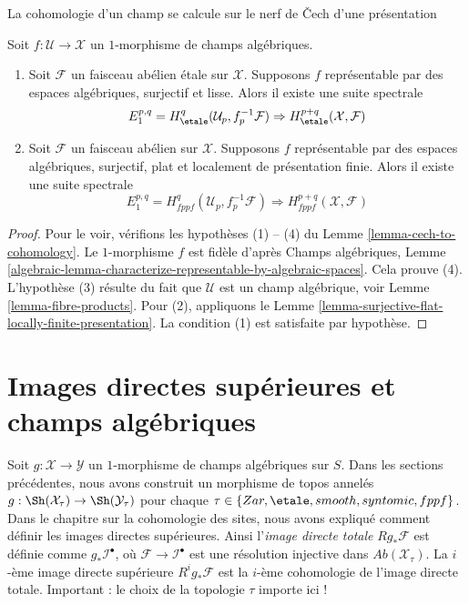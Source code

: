 \begin{proposition}
\label{proposition-smooth-covering-compute-cohomology}
\begin{slogan}
La cohomologie d'un champ se calcule sur le nerf de Čech d'une présentation
\end{slogan}
Soit $f : \mathcal{U} \to \mathcal{X}$ un $1$-morphisme de champs algébriques.
\begin{enumerate}
\item Soit $\mathcal{F}$ un faisceau abélien \'etale sur $\mathcal{X}$.
Supposons $f$ représentable par des espaces algébriques, surjectif et lisse.
Alors il existe une suite spectrale
$$
E_1^{p, q} = H^q_\etale(\mathcal{U}_p, f_p^{-1}\mathcal{F})
\Rightarrow
H^{p + q}_\etale(\mathcal{X}, \mathcal{F})
$$
\item Soit $\mathcal{F}$ un faisceau abélien sur $\mathcal{X}$.
Supposons $f$ représentable par des espaces algébriques, surjectif, plat
et localement de présentation finie. Alors il existe
une suite spectrale
$$
E_1^{p, q} = H^q_{fppf}(\mathcal{U}_p, f_p^{-1}\mathcal{F})
\Rightarrow
H^{p + q}_{fppf}(\mathcal{X}, \mathcal{F})
$$
\end{enumerate}
\end{proposition}

\begin{proof}
Pour le voir, vérifions les hypothèses (1) -- (4) du
Lemme \ref{lemma-cech-to-cohomology}.
Le $1$-morphisme $f$ est fidèle d'après
Champs algébriques, Lemme
\ref{algebraic-lemma-characterize-representable-by-algebraic-spaces}.
Cela prouve (4).
L'hypothèse (3) résulte du fait que $\mathcal{U}$ est un champ
algébrique, voir
Lemme \ref{lemma-fibre-products}.
Pour (2), appliquons le
Lemme \ref{lemma-surjective-flat-locally-finite-presentation}.
La condition (1) est satisfaite par hypothèse.
\end{proof}










\section{Images directes supérieures et champs algébriques}
\label{section-higher-direct-images}

\noindent
Soit $g : \mathcal{X} \to \mathcal{Y}$ un $1$-morphisme de champs algébriques
sur $S$. Dans les sections précédentes, nous avons construit un morphisme de topos
annelés $g : \Sh(\mathcal{X}_\tau) \to \Sh(\mathcal{Y}_\tau)$
pour chaque $\tau \in \{Zar, \etale, smooth, syntomic, fppf\}$.
Dans le chapitre sur la cohomologie des sites, nous avons expliqué comment
définir les images directes supérieures. Ainsi l'{\it image directe totale}
$Rg_*\mathcal{F}$ est définie comme $g_*\mathcal{I}^\bullet$, où
$\mathcal{F} \to \mathcal{I}^\bullet$ est une résolution injective dans
$\textit{Ab}(\mathcal{X}_\tau)$. La $i$-ème image directe supérieure
$R^ig_*\mathcal{F}$ est la $i$-ème cohomologie de l'image directe totale.
Important : le choix de la topologie $\tau$ importe ici !

